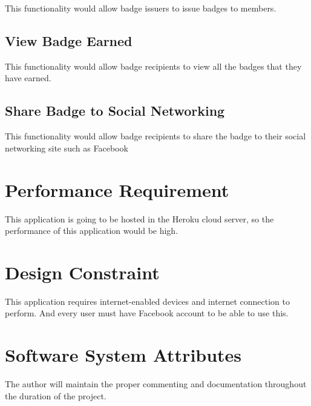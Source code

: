 This functionality would allow badge issuers to issue badges to members. 

\subsection{View Badge Earned}

This functionality would allow badge recipients to view all the badges that they have earned.

\subsection{Share Badge to Social Networking} 

This functionality would allow badge recipients to share the badge to their social networking site such as Facebook

\section{Performance Requirement}

This application is going to be hosted in the Heroku cloud server, so the performance of this application would be high.
 
\section{Design Constraint}

This application requires internet-enabled devices and internet connection to perform. And every user must have Facebook account to be able to use this. 

\section{Software System Attributes}

The author will maintain the proper commenting and documentation throughout the duration of the project.
